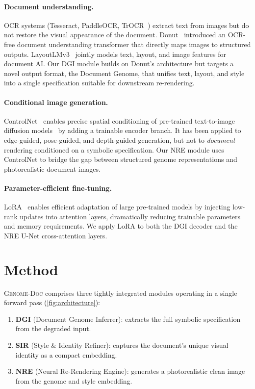 \documentclass[conference]{IEEEtran}
\newcommand{\ours}{\textsc{Genome-Doc}}
\newcommand{\dgi}{\textsc{DGI}}
\newcommand{\sir}{\textsc{SIR}}
\newcommand{\nre}{\textsc{NRE}}
\begin{document}
\paragraph{Document understanding.}
OCR systems (Tesseract, PaddleOCR, TrOCR~\cite{li2021trocr}) extract text from
images but do not restore the visual appearance of the document.
Donut~\cite{kim2022donut} introduced an OCR-free document understanding transformer
that directly maps images to structured outputs.
LayoutLMv3~\cite{huang2022layoutlmv3} jointly models text, layout, and image features
for document AI.  Our \dgi{} module builds on Donut's architecture but targets a
novel output format, the Document Genome, that unifies text, layout, and style
into a single specification suitable for downstream re-rendering.

\paragraph{Conditional image generation.}
ControlNet~\cite{zhang2023controlnet} enables precise spatial conditioning of
pre-trained text-to-image diffusion models~\cite{rombach2022stablediffusion} by
adding a trainable encoder branch.  It has been applied to edge-guided, pose-guided,
and depth-guided generation, but not to \emph{document} rendering conditioned on a
symbolic specification.  Our \nre{} module uses ControlNet to bridge the gap between
structured genome representations and photorealistic document images.

\paragraph{Parameter-efficient fine-tuning.}
LoRA~\cite{hu2022lora} enables efficient adaptation of large pre-trained models by
injecting low-rank updates into attention layers, dramatically reducing trainable
parameters and memory requirements.  We apply LoRA to both the DGI decoder and the
NRE U-Net cross-attention layers.

\section{Method}
\label{sec:method}

\ours{} comprises three tightly integrated modules operating in a single forward
pass (\cref{fig:architecture}):
\begin{enumerate}[leftmargin=*,nosep]
  \item \textbf{\dgi{}} (Document Genome Inferrer): extracts the full symbolic
    specification from the degraded input.
  \item \textbf{\sir{}} (Style \& Identity Refiner): captures the document's
    unique visual identity as a compact embedding.
  \item \textbf{\nre{}} (Neural Re-Rendering Engine): generates a photorealistic
    clean image from the genome and style embedding.
\end{enumerate}
\end{document}
